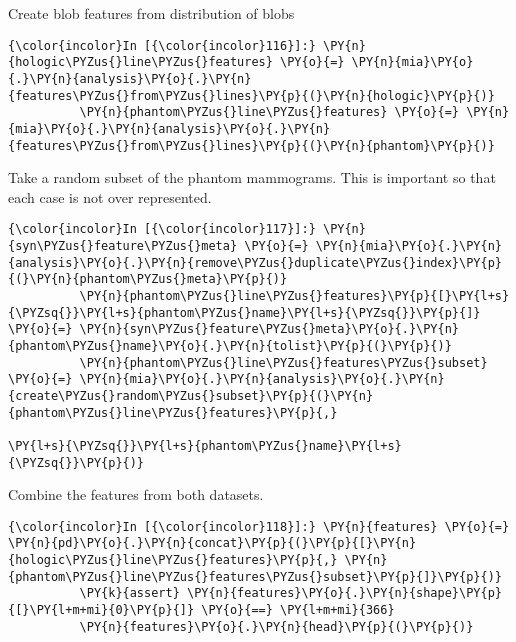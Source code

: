     Create blob features from distribution of blobs

    \begin{Verbatim}[commandchars=\\\{\}]
{\color{incolor}In [{\color{incolor}116}]:} \PY{n}{hologic\PYZus{}line\PYZus{}features} \PY{o}{=} \PY{n}{mia}\PY{o}{.}\PY{n}{analysis}\PY{o}{.}\PY{n}{features\PYZus{}from\PYZus{}lines}\PY{p}{(}\PY{n}{hologic}\PY{p}{)}
          \PY{n}{phantom\PYZus{}line\PYZus{}features} \PY{o}{=} \PY{n}{mia}\PY{o}{.}\PY{n}{analysis}\PY{o}{.}\PY{n}{features\PYZus{}from\PYZus{}lines}\PY{p}{(}\PY{n}{phantom}\PY{p}{)}
\end{Verbatim}

    Take a random subset of the phantom mammograms. This is important so
that each case is not over represented.

    \begin{Verbatim}[commandchars=\\\{\}]
{\color{incolor}In [{\color{incolor}117}]:} \PY{n}{syn\PYZus{}feature\PYZus{}meta} \PY{o}{=} \PY{n}{mia}\PY{o}{.}\PY{n}{analysis}\PY{o}{.}\PY{n}{remove\PYZus{}duplicate\PYZus{}index}\PY{p}{(}\PY{n}{phantom\PYZus{}meta}\PY{p}{)}
          \PY{n}{phantom\PYZus{}line\PYZus{}features}\PY{p}{[}\PY{l+s}{\PYZsq{}}\PY{l+s}{phantom\PYZus{}name}\PY{l+s}{\PYZsq{}}\PY{p}{]} \PY{o}{=} \PY{n}{syn\PYZus{}feature\PYZus{}meta}\PY{o}{.}\PY{n}{phantom\PYZus{}name}\PY{o}{.}\PY{n}{tolist}\PY{p}{(}\PY{p}{)}
          \PY{n}{phantom\PYZus{}line\PYZus{}features\PYZus{}subset} \PY{o}{=} \PY{n}{mia}\PY{o}{.}\PY{n}{analysis}\PY{o}{.}\PY{n}{create\PYZus{}random\PYZus{}subset}\PY{p}{(}\PY{n}{phantom\PYZus{}line\PYZus{}features}\PY{p}{,}
                                                                           \PY{l+s}{\PYZsq{}}\PY{l+s}{phantom\PYZus{}name}\PY{l+s}{\PYZsq{}}\PY{p}{)}
\end{Verbatim}

    Combine the features from both datasets.

    \begin{Verbatim}[commandchars=\\\{\}]
{\color{incolor}In [{\color{incolor}118}]:} \PY{n}{features} \PY{o}{=} \PY{n}{pd}\PY{o}{.}\PY{n}{concat}\PY{p}{(}\PY{p}{[}\PY{n}{hologic\PYZus{}line\PYZus{}features}\PY{p}{,} \PY{n}{phantom\PYZus{}line\PYZus{}features\PYZus{}subset}\PY{p}{]}\PY{p}{)}
          \PY{k}{assert} \PY{n}{features}\PY{o}{.}\PY{n}{shape}\PY{p}{[}\PY{l+m+mi}{0}\PY{p}{]} \PY{o}{==} \PY{l+m+mi}{366}
          \PY{n}{features}\PY{o}{.}\PY{n}{head}\PY{p}{(}\PY{p}{)}
\end{Verbatim}

